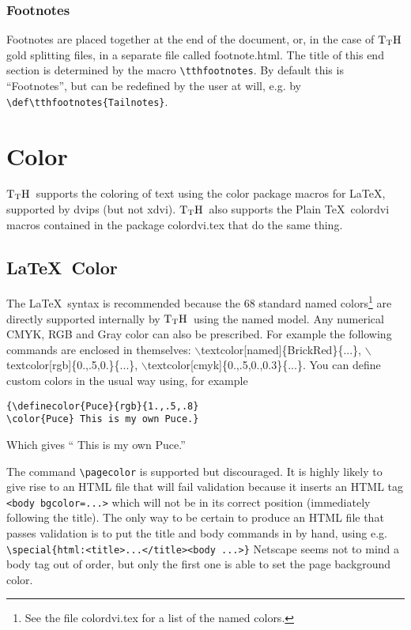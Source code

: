 \documentclass[12pt]{article}
\def\TtH{$\rm{}T_TH$}
\begin{document}
\subsubsection{Footnotes}
Footnotes are placed together at the end of the document, or, in the
case of \TtH gold splitting files, in a separate file called
footnote.html. The title of this end section is determined by the
macro \verb!\tthfootnotes!. By default this is ``Footnotes'', but can
be redefined by the user at will, e.g. by
\verb!\def\tthfootnotes{Tailnotes}!.


\section{Color}
\TtH\ supports the coloring of text using the color package macros for
\LaTeX, supported by dvips (but not xdvi).  \TtH\ also supports the Plain
\TeX\ colordvi macros contained in the package colordvi.tex that do the
same thing. 

\subsection{\LaTeX\ Color}

The \LaTeX\ syntax is recommended because the 68 standard
named colors\footnote{See the file colordvi.tex for a list of
the named colors.} are directly supported internally by \TtH\ using the named
model. Any numerical CMYK, RGB and Gray color can also be prescribed. For
example the following commands are enclosed in themselves:
\textcolor[named]{BrickRed}{$\backslash$textcolor[named]\{BrickRed\}\{...\}},
\textcolor[rgb]{0.,.5,0.}{$\backslash$textcolor[rgb]\{0.,.5,0.\}\{...\}},
\textcolor[cmyk]{0.,.5,0.,.3}{$\backslash$textcolor[cmyk]\{0.,.5,0.,0.3\}\{...\}}.
You can define custom colors in the usual way using, for example
\begin{verbatim}
{\definecolor{Puce}{rgb}{1.,.5,.8}
\color{Puce} This is my own Puce.}
\end{verbatim}
Which gives ``{
\color{Puce}This is my own Puce.}''

The command \verb!\pagecolor! is supported but discouraged. It
is highly likely to give rise to an HTML file that will fail
validation because it inserts an HTML tag \verb!<body bgcolor=...>!
which will not be in its correct position (immediately following the
title). The only way to be certain to produce an HTML file that passes
validation is to put the title and body commands in by hand, using
e.g.  \verb!\special{html:<title>...</title><body ...>}!  Netscape
seems not to mind a body tag out of order, but only the first one is
able to set the page background color.
\end{document}
